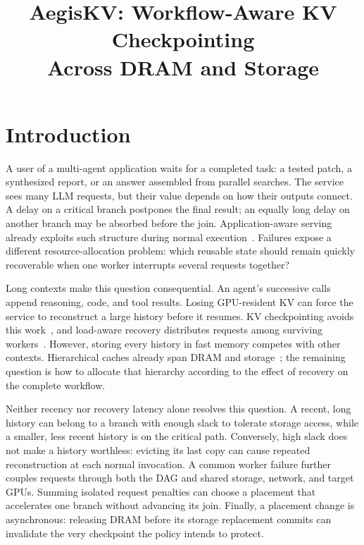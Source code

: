 \documentclass[sigplan,10pt,anonymous,nonacm]{acmart}
\title{AegisKV: Workflow-Aware KV Checkpointing\texorpdfstring{\\}{ }Across DRAM and Storage}
\begin{document}
\pagestyle{aegispreview}

\maketitle
\thispagestyle{aegispreview}
\raggedbottom

\section{Introduction}
\label{sec:introduction}

A user of a multi-agent application waits for a completed task: a tested
patch, a synthesized report, or an answer assembled from parallel searches.
The service sees many LLM requests, but their value depends on how their
outputs connect. A delay on a critical branch postpones the final result;
an equally long delay on another branch may be absorbed before the join.
Application-aware serving already exploits such structure during normal
execution~\cite{lin2024parrot,pan2025kvflow,ni2026topas}. Failures expose a
different resource-allocation problem: which reusable state should remain
quickly recoverable when one worker interrupts several requests together?

Long contexts make this question consequential. An agent's successive
calls append reasoning, code, and tool results. Losing GPU-resident KV
can force the service to reconstruct a large history before it resumes.
KV checkpointing avoids this work~\cite{strati2024dejavu,jayakody2026ghostserve},
and load-aware recovery distributes requests among surviving
workers~\cite{cao2026lumen}. However, storing every history in fast memory
competes with other contexts. Hierarchical caches already span DRAM and
storage~\cite{qin2025mooncake,xie2026strata}; the remaining question is how
to allocate that hierarchy according to the effect of recovery on the
complete workflow.

Neither recency nor recovery latency alone resolves this question. A
recent, long history can belong to a branch with enough slack to tolerate
storage access, while a smaller, less recent history is on the critical
path. Conversely, high slack does not make a history worthless: evicting
its last copy can cause repeated reconstruction at each normal invocation.
A common worker failure further couples requests through both the DAG and
shared storage, network, and target GPUs. Summing isolated request penalties
can choose a placement that accelerates one branch without advancing its
join. Finally, a placement change is asynchronous: releasing DRAM before
its storage replacement commits can invalidate the very checkpoint the
policy intends to protect.
\end{document}
